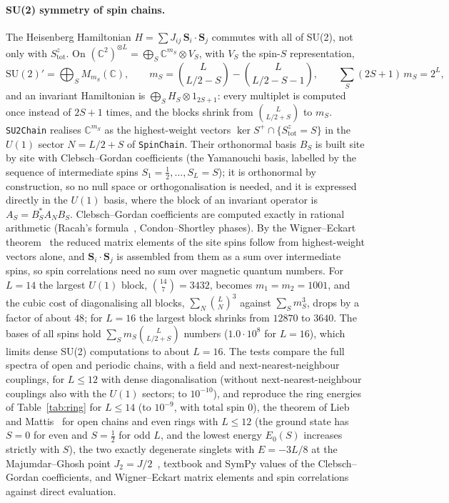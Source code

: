 \documentclass[11pt]{article}
\newcommand{\C}{\mathbb{C}}
\begin{document}
\paragraph{SU(2) symmetry of spin chains.} The Heisenberg Hamiltonian $H=\sum J_{ij}\,\mathbf S_i\cdot\mathbf S_j$
commutes with all of SU(2), not only with $S^z_{\mathrm{tot}}$. On $(\C^2)^{\otimes L}=\bigoplus_S\C^{m_S}\otimes
V_S$, with $V_S$ the spin-$S$ representation,
\[
  \mathrm{SU}(2)'=\bigoplus_SM_{m_S}(\C),\qquad m_S=\binom{L}{L/2-S}-\binom{L}{L/2-S-1},\qquad
  \sum_S(2S+1)\,m_S=2^L ,
\]
and an invariant Hamiltonian is $\bigoplus_SH_S\otimes1_{2S+1}$: every multiplet is computed once instead of $2S+1$
times, and the blocks shrink from $\binom L{L/2+S}$ to $m_S$. \texttt{SU2Chain} realises $\C^{m_S}$ as the
highest-weight vectors $\ker S^+\cap\{S^z_{\mathrm{tot}}=S\}$ in the $U(1)$ sector $N=L/2+S$ of \texttt{SpinChain}.
Their orthonormal basis $B_S$ is built site by site with Clebsch--Gordan coefficients (the Yamanouchi basis, labelled by
the sequence of intermediate spins $S_1=\frac12,\dots,S_L=S$); it is orthonormal by construction, so no null space or
orthogonalisation is needed, and it is expressed directly in the $U(1)$ basis, where the block of an invariant
operator is $A_S=B_S^*A_NB_S$. Clebsch--Gordan coefficients are computed exactly in rational arithmetic (Racah's
formula~\cite{racah1942}, Condon--Shortley phases). By the Wigner--Eckart theorem~\cite{edmonds1957} the reduced
matrix elements of the site spins follow from highest-weight vectors alone, and $\mathbf S_i\cdot\mathbf S_j$ is
assembled from them as a sum over intermediate spins, so spin correlations need no sum over magnetic quantum numbers.
For $L=14$ the largest $U(1)$ block, $\binom{14}{7}=3432$, becomes $m_1=m_2=1001$, and the cubic cost of diagonalising
all blocks, $\sum_N\binom LN^3$ against $\sum_Sm_S^3$, drops by a factor of about $48$; for $L=16$ the largest block
shrinks from $12870$ to $3640$. The bases of all spins hold $\sum_Sm_S\binom L{L/2+S}$ numbers ($1.0\cdot10^8$ for
$L=16$), which limits dense SU(2) computations to about $L=16$. The tests compare the full spectra of open and periodic
chains, with a field and next-nearest-neighbour couplings, for $L\le12$ with dense diagonalisation (without next-nearest-neighbour
couplings also with the $U(1)$ sectors; to $10^{-10}$), and reproduce the ring energies of Table~\ref{tab:ring} for $L\le14$ (to $10^{-9}$, with total
spin $0$), the theorem of Lieb and Mattis~\cite{lieb1962} for open chains and even rings with $L\le12$ (the ground
state has $S=0$ for even and $S=\frac12$ for odd $L$, and the lowest energy $E_0(S)$ increases strictly with $S$), the
two exactly degenerate singlets with $E=-3L/8$ at the Majumdar--Ghosh point $J_2=J/2$~\cite{majumdar1969}, textbook
and SymPy values of the Clebsch--Gordan coefficients, and Wigner--Eckart matrix elements and spin correlations against
direct evaluation.
\end{document}
